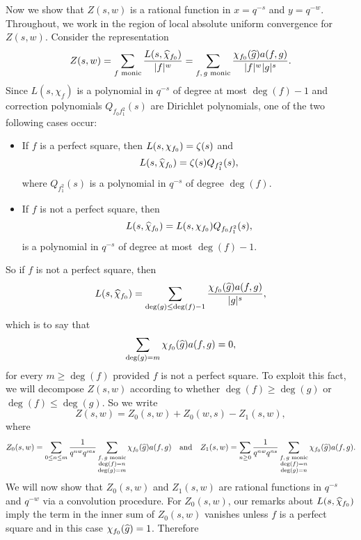 \documentclass[12pt,reqno,oneside]{amsart}
\begin{document}
    Now we show that $Z(s,w)$ is a rational function in $x = q^{-s}$ and $y = q^{-w}$. Throughout, we work in the region of local absolute uniform convergence for $Z(s,w)$. Consider the representation
    \[
        Z(s,w) = \sum_{\text{$f$ monic}}\frac{L(s,\widehat{\chi}_{f_{0}})}{|f|^{w}} = \sum_{\text{$f,g$ monic}}\frac{\chi_{f_{0}}(\widehat{g})a(f,g)}{|f|^{w}|g|^{s}}.
    \]
    Since $L(s,\chi_{f})$ is a polynomial in $q^{-s}$ of degree at most $\deg(f)-1$ and correction polynomials $Q_{f_{0}f_{1}^{2}}(s)$ are Dirichlet polynomials, one of the two following cases occur:
    \begin{itemize}
        \item If $f$ is a perfect square, then $L(s,\chi_{f_{0}}) = \zeta(s)$ and
        \[
            L(s,\widehat{\chi}_{f_{0}}) = \zeta(s)Q_{f_{1}^{2}}(s),
        \]
        where $Q_{f_{1}^{2}}(s)$ is a polynomial in $q^{-s}$ of degree $\deg(f)$.
        \item If $f$ is not a perfect square, then
        \[
            L(s,\widehat{\chi}_{f_{0}}) = L(s,\chi_{f_{0}})Q_{f_{0}f_{1}^{2}}(s),
        \]
        is a polynomial in $q^{-s}$ of degree at most $\deg(f)-1$.
    \end{itemize}
    So if $f$ is not a perfect square, then
    \[
        L(s,\widehat{\chi}_{f_{0}}) = \sum_{\deg(g) \le \deg(f)-1}\frac{\chi_{f_{0}}(\widehat{g})a(f,g)}{|g|^{s}},
    \]
    which is to say that
    \[
        \sum_{\deg(g) = m}\chi_{f_{0}}(\widehat{g})a(f,g) = 0,
    \]
    for every $m \ge \deg(f)$ provided $f$ is not a perfect square. To exploit this fact, we will decompose $Z(s,w)$ according to whether $\deg(f) \ge \deg(g)$ or $\deg(f) \le \deg(g)$. So we write
    \[
        Z(s,w) = Z_{0}(s,w)+Z_{0}(w,s)-Z_{1}(s,w),
    \]
    where
    \[
        Z_{0}(s,w) = \sum_{0 \le n \le m}\frac{1}{q^{nw}q^{ms}}\sum_{\substack{\text{$f,g$ monic} \\ \deg(f) = n \\ \deg(g) = m}}\chi_{f_{0}}(\widehat{g})a(f,g) \quad \text{and} \quad Z_{1}(s,w) = \sum_{n \ge 0}\frac{1}{q^{nw}q^{ns}}\sum_{\substack{\text{$f,g$ monic} \\ \deg(f) = n \\ \deg(g) = n}}\chi_{f_{0}}(\widehat{g})a(f,g).
    \]
    We will now show that $Z_{0}(s,w)$ and $Z_{1}(s,w)$ are rational functions in $q^{-s}$ and $q^{-w}$ via a convolution procedure. For $Z_{0}(s,w)$, our remarks about $L(s,\widehat{\chi}_{f_{0}})$ imply the term in the inner sum of $Z_{0}(s,w)$ vanishes unless $f$ is a perfect square and in this case $\chi_{f_{0}}(\widehat{g}) = 1$. Therefore
\end{document}
